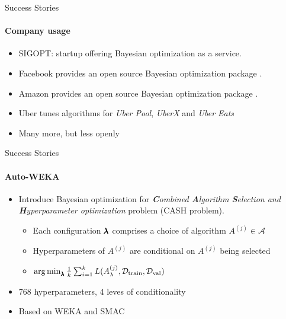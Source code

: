 \begin{frame}[c]{Success Stories}
\framesubtitle{Company usage}
\begin{itemize}
    \item SIGOPT: startup offering Bayesian optimization as a service.
    \item Facebook provides an open source Bayesian optimization package .
    \item Amazon provides an open source Bayesian optimization package .
    \item Uber tunes algorithms for \emph{Uber Pool}, \emph{UberX} and \emph{Uber Eats} 
    \item Many more, but less openly
\end{itemize}
\end{frame}

\begin{frame}[c]{Success Stories}
\framesubtitle{Auto-WEKA}
\begin{itemize}
    \item Introduce Bayesian optimization for \emph{\textbf{C}ombined \textbf{A}lgorithm \textbf{S}election and \textbf{H}yperparameter optimization} problem (CASH problem).
    \begin{itemize}
        \item Each configuration $\pmb{\lambda}$ comprises a choice of algorithm $A^{(j)} \in \mathcal{A}$
        \item Hyperparameters of $A^{(j)}$ are conditional on $A^{(j)}$ being selected
        \item $\operatorname*{arg\,min}_{\pmb{\lambda}} \frac{1}{k} \sum^k_{i=1} L(A^{(j)}_\lambda,\mathcal{D}_{\text{train}},\mathcal{D}_{\text{val}})$
    \end{itemize}
    \item 768 hyperparameters, 4 leves of conditionality
    \item Based on WEKA and SMAC
\end{itemize}

\vspace{1cm}
\hspace{12cm}

\end{frame}

